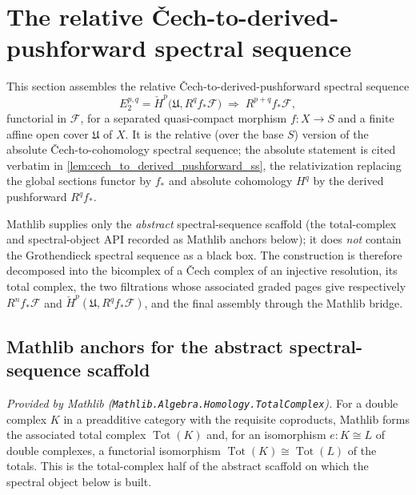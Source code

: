 \section{The relative {\v C}ech-to-derived-pushforward spectral sequence}
\label{sec:cech_to_derived_pushforward_ss}

This section assembles the relative {\v C}ech-to-derived-pushforward spectral
sequence
\[
  E_2^{p,q} = \check{H}^p\bigl(\mathfrak{U}, R^q f_* \mathcal{F}\bigr)
  \;\Longrightarrow\;
  R^{p+q} f_* \mathcal{F},
\]
functorial in \(\mathcal{F}\), for a separated quasi-compact morphism
\(f : X \to S\) and a finite affine open cover \(\mathfrak{U}\) of \(X\). It is the
relative (over the base \(S\)) version of the absolute {\v C}ech-to-cohomology
spectral sequence; the absolute statement is cited verbatim in
\cref{lem:cech_to_derived_pushforward_ss}, the relativization replacing the global
sections functor by \(f_*\) and absolute cohomology \(H^q\) by the derived
pushforward \(R^q f_*\).

Mathlib supplies only the \emph{abstract} spectral-sequence scaffold (the
total-complex and spectral-object API recorded as Mathlib anchors below); it does
\emph{not} contain the Grothendieck spectral sequence as a black box. The
construction is therefore decomposed into the bicomplex of a {\v C}ech complex of an
injective resolution, its total complex, the two filtrations whose associated graded
pages give respectively \(R^n f_*\mathcal{F}\) and
\(\check{H}^p(\mathfrak{U}, R^q f_*\mathcal{F})\), and the final assembly through the
Mathlib bridge.

\subsection{Mathlib anchors for the abstract spectral-sequence scaffold}

\begin{lemma}
  \label{lem:total_complex_mathlib}
  \mathlibok
  \textit{Provided by Mathlib (\texttt{Mathlib.Algebra.Homology.TotalComplex}).}
  For a double complex \(K\) in a preadditive category with the requisite coproducts,
  Mathlib forms the associated total complex \(\operatorname{Tot}(K)\) and, for an
  isomorphism \(e : K \cong L\) of double complexes, a functorial isomorphism
  \(\operatorname{Tot}(K) \cong \operatorname{Tot}(L)\) of the totals. This is the
  total-complex half of the abstract scaffold on which the spectral object below is
  built.
\end{lemma}

